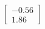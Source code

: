 \documentclass[preview]{standalone}
\begin{document}
\begin{align*}
\begin{bmatrix} -0.56 \\ 1.86 \end{bmatrix}
\end{align*}
\end{document}
